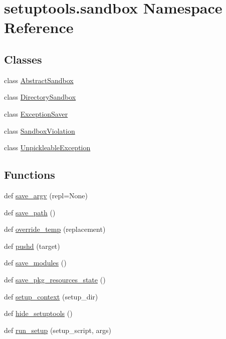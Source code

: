 \hypertarget{namespacesetuptools_1_1sandbox}{}\section{setuptools.\+sandbox Namespace Reference}
\label{namespacesetuptools_1_1sandbox}
\subsection*{Classes}
\begin{DoxyCompactItemize}
\item 
class \hyperlink{classsetuptools_1_1sandbox_1_1AbstractSandbox}{Abstract\+Sandbox}
\item 
class \hyperlink{classsetuptools_1_1sandbox_1_1DirectorySandbox}{Directory\+Sandbox}
\item 
class \hyperlink{classsetuptools_1_1sandbox_1_1ExceptionSaver}{Exception\+Saver}
\item 
class \hyperlink{classsetuptools_1_1sandbox_1_1SandboxViolation}{Sandbox\+Violation}
\item 
class \hyperlink{classsetuptools_1_1sandbox_1_1UnpickleableException}{Unpickleable\+Exception}
\end{DoxyCompactItemize}
\subsection*{Functions}
\begin{DoxyCompactItemize}
\item 
def \hyperlink{namespacesetuptools_1_1sandbox_a2a79966d30bf09df3b132b92a596738c}{save\+\_\+argv} (repl=None)
\item 
def \hyperlink{namespacesetuptools_1_1sandbox_a057c8a6e653446a00924ea4809b63dc6}{save\+\_\+path} ()
\item 
def \hyperlink{namespacesetuptools_1_1sandbox_a2c4ba056356a14d170e0b4b60fd02580}{override\+\_\+temp} (replacement)
\item 
def \hyperlink{namespacesetuptools_1_1sandbox_a7971928fb0fbf584da85d366379232d3}{pushd} (target)
\item 
def \hyperlink{namespacesetuptools_1_1sandbox_a03b1ef3f49621d5d24d9847920d2a71a}{save\+\_\+modules} ()
\item 
def \hyperlink{namespacesetuptools_1_1sandbox_a7f34d1ea59a8595bed11a0c2f0e84aef}{save\+\_\+pkg\+\_\+resources\+\_\+state} ()
\item 
def \hyperlink{namespacesetuptools_1_1sandbox_a52b79978a4d33340bc744648198b5a87}{setup\+\_\+context} (setup\+\_\+dir)
\item 
def \hyperlink{namespacesetuptools_1_1sandbox_a2866b4e88f03f6075fed0f7a530261c3}{hide\+\_\+setuptools} ()
\item 
def \hyperlink{namespacesetuptools_1_1sandbox_ac27deefbd9b5163ee6861eb07b93bc23}{run\+\_\+setup} (setup\+\_\+script, args)
\end{DoxyCompactItemize}
